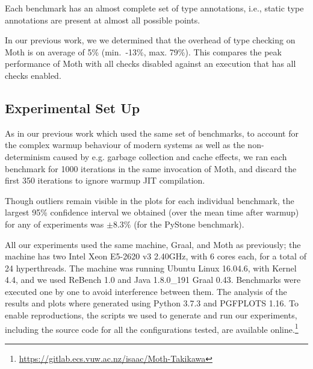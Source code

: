 \documentclass[sigplan,screen]{acmart}
\newcommand{\ie}{i.e.\xspace}
\newcommand{\eg}{e.g.\xspace}
\begin{document}
Each benchmark has an almost complete set of type annotations,
\ie, static type annotations are present at almost all possible points.

In our previous work, we \cite{roberts-and-co-ecoop-2019}
we determined that the overhead of type checking on Moth is on average
of 5\% (min.\ -13\%, max. 79\%).
This compares the peak performance of Moth with all
checks disabled against an execution that has all checks enabled. 
%

\subsection{Experimental Set Up}
As in our previous work \cite{roberts-and-co-ecoop-2019} which used the same set of benchmarks, to account for the complex warmup behaviour of modern systems \citep{Barrett:2017:VMW} as well as
the non-determinism caused by \eg garbage collection and cache effects, we ran each benchmark for 1000 iterations in the same invocation of Moth, and discard the first 350 iterations to ignore warmup JIT compilation.

Though outliers remain visible in the plots for each individual benchmark, the largest 95\% confidence interval we obtained (over the mean time after warmup) for any of experiments was $\pm8.3\%$ (for the PyStone benchmark).

All our experiments used the same machine, Graal, and Moth as previously; the machine has two Intel Xeon E5-2620 v3 2.40GHz, with 6 cores each, for a total of 24 hyperthreads.
The machine was running Ubuntu Linux 16.04.6, with Kernel 4.4, and we used ReBench 1.0 \citep{ReBench:2018} and Java 1.8.0\_191 Graal 0.43. Benchmarks were executed one by one to avoid interference between them. The analysis of the results and plots where generated using Python 3.7.3 and PGFPLOTS 1.16. To enable reproductions, the scripts we used to generate and run our experiments, including the source code for all the configurations tested, are available online.\footnote{\url{https://gitlab.ecs.vuw.ac.nz/isaac/Moth-Takikawa}}
\end{document}
